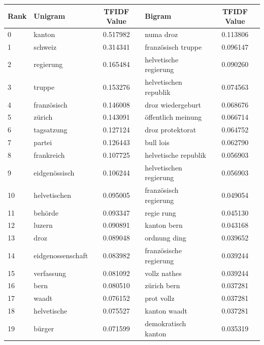 \documentclass[11pt]{article}
\begin{document}
\begin{table}[H]
\begin{small}
\begin{center}
\label{TFIDF_Terms_Top_Twenty_2}
\begin{tabular*}{\textwidth}{|l|| @{\extracolsep{\fill}} l c || l c |} 
\hline
Rank & Unigram & TFIDF Value  & Bigram & TFIDF Value \\
\hline
\hline
0 	& 	kanton 	& 	0.517982 	& 	numa droz 	& 	0.113806 	\\
1 	& 	schweiz 	& 	0.314341 	& 	französisch truppe 	& 	0.096147 	\\
2 	& 	regierung 	& 	0.165484 	& 	helvetische regierung 	& 	0.090260 	\\
3 	& 	truppe 	& 	0.153276 	& 	helvetischen republik 	& 	0.074563 	\\
4 	& 	französisch 	& 	0.146008 	& 	droz wiedergeburt 	& 	0.068676 	\\
5 	& 	zürich 	& 	0.143091 	& 	öffentlich meinung 	& 	0.066714 	\\
6 	& 	tagsatzung 	& 	0.127124 	& 	droz protektorat 	& 	0.064752 	\\
7 	& 	partei 	& 	0.126443 	& 	bull lois 	& 	0.062790 	\\
8 	& 	frankreich 	& 	0.107725 	& 	helvetische republik 	& 	0.056903 	\\
9 	& 	eidgenössisch 	& 	0.106244 	& 	helvetischen regierung 	& 	0.056903 	\\
10 	& 	helvetischen 	& 	0.095005 	& 	französisch regierung 	& 	0.049054 	\\
11 	& 	behörde 	& 	0.093347 	& 	regie rung 	& 	0.045130 	\\
12 	& 	luzern 	& 	0.090891 	& 	kanton bern 	& 	0.043168 	\\
13 	& 	droz 	& 	0.089048 	& 	ordnung ding 	& 	0.039652 	\\
14 	& 	eidgenossenschaft 	& 	0.083982 	& 	französische regierung 	& 	0.039244 	\\
15 	& 	verfassung 	& 	0.081092 	& 	vollz nathes 	& 	0.039244 	\\
16 	& 	bern 	& 	0.080510 	& 	zürich bern 	& 	0.037281 	\\
17 	& 	waadt 	& 	0.076152 	& 	prot vollz 	& 	0.037281 	\\
18 	& 	helvetische 	& 	0.075527 	& 	kanton waadt 	& 	0.037281 	\\
19 	& 	bürger 	& 	0.071599 	& 	demokratisch kanton 	& 	0.035319 	\\

\end{tabular*}
\end{center}
\end{small}
\end{table}
\end{document}

